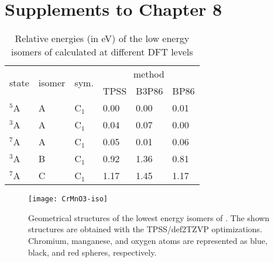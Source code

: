 


\chapter{Supplements to Chapter 8}\label{appendix:a8}


\begin{table}[]
	\centering
	\caption{Relative energies (in eV) of the low energy isomers of  calculated at different DFT levels}
	\begin{tabular}{@{}llllll@{}}
	\toprule
	\multirow{2}{*}{state} & \multirow{2}{*}{isomer} & \multirow{2}{*}{sym.} & \multicolumn{3}{c}{method} \\ \cmidrule(l){4-6} 
						   &                         &                       & TPSS    & B3P86   & BP86   \\ \midrule
	$^5$A    & A    & C$_1$ &   0.00    & 0.00    & 0.01   \\
	$^3$A    & A    & C$_1$ &   0.04    & 0.07    & 0.00   \\
	$^7$A    & A    & C$_1$ &   0.05    & 0.01    & 0.06   \\
	$^3$A    & B    & C$_1$ &   0.92    & 1.36    & 0.81   \\
	$^7$A    & C    & C$_1$ &   1.17    & 1.45    & 1.17   \\ \bottomrule
	\end{tabular}
	\label{tbl:CrMnO3}
	\end{table}

	\begin{figure}
		\centering
		\texttt{[image: CrMnO3-iso]}
		\caption{Geometrical structures of the lowest energy isomers of . The shown structures are obtained with the TPSS/def2TZVP optimizations. Chromium, manganese, and oxygen atoms are represented as blue, black, and red spheres, respectively.}
		\label{figs:CrMnO3}
	\end{figure}




